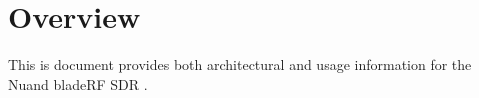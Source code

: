 \def \title{bladeRF User Guide}
\def \subtitle{A comprehensive user guide for the Nuand bladeRF}

\def \emailbpadalino    {\href{mailto:brian.padalino@nuand.com?cc=bladeRF@nuand.com}{\textless{brian.padalino@nuand.com}\textgreater}}
\def \emailjszymaniak   {\href{mailto:jon.szymaniak@nuand.com?cc=bladeRF@nuand.com}{\textless{jon.szymaniak@nuand.com}\textgreater}}
\def \afilnuand         {Nuand, LLC}

\def \authors{
  \begin{table}[h]
    \centering
    \begin{tabular}{cc}
      Brian Padalino    & Jon Szymaniak     \\ 
      \emailbpadalino   & \emailjszymaniak  \\
      \afilnuand        & \afilnuand        \\
    \end{tabular}
  \end{table}
}


\def \tablerowcolor{\rowcolor[HTML]{C0C0C0}}
\def \tablecolcolor{\columncolor[HTML]{C0C0C0}}

\def \revisions {
  \begin{table}[h]
    \centering
    \begin{tabular}{|c|c|l|}
      \hline
      \tablerowcolor
      \textbf{Revision} & \textbf{Date} & \textbf{Summary} \hspace{4in}  \\ \hline
      1  & TBD & Draft: Work in progress \\ \hline
    \end{tabular}
  \end{table}
}

\def \enablefiguretableindex{yes}

\def \enableacronymlist{yes}





\whitepapercover
\docinfo

\section{Overview}

This is document provides both architectural and usage information for the
Nuand bladeRF \ac{SDR} \cite{BLADERF}.

\newpage
{\footnotesize \bib}

